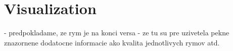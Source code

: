 \chapter{Visualization}
- predpokladame, ze rym je na konci versa
- ze tu su pre uzivetela pekne znazornene dodatocne informacie ako kvalita jednotlivych rymov atd.